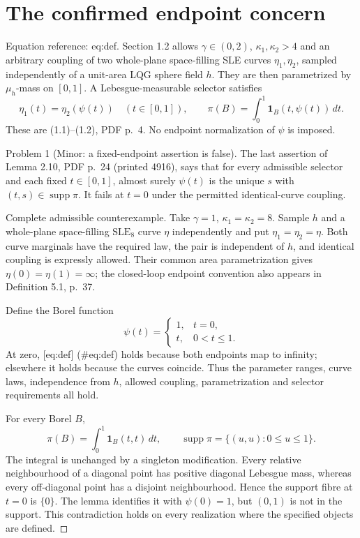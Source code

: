 \documentclass[10pt]{article}
\begin{document}
\section*{The confirmed endpoint concern}
Equation reference: eq:def. Section 1.2 allows \(\gamma\in(0,2)\), \(\kappa_1,\kappa_2>4\) and an arbitrary coupling of two whole-plane space-filling SLE curves \(\eta_1,\eta_2\), sampled independently of a unit-area LQG sphere field \(h\). They are then parametrized by \(\mu_h\)-mass on \([0,1]\). A Lebesgue-measurable selector satisfies \[\eta_1(t)=\eta_2(\psi(t))\quad(t\in[0,1]),\qquad
 \pi(B)=\int_0^1\mathbf 1_B(t,\psi(t))\,dt. \] These are (1.1)–(1.2), PDF p. 4. No endpoint normalization of \(\psi\) is imposed.\par
Problem 1 (Minor: a fixed-endpoint assertion is false).  The last assertion of Lemma 2.10, PDF p. 24 (printed 4916), says that for every admissible selector and each fixed \(t\in[0,1]\), almost surely \(\psi(t)\) is the unique \(s\) with \((t,s)\in\operatorname{supp}\pi\). It fails at \(t=0\) under the permitted identical-curve coupling.\par
Complete admissible counterexample. Take \(\gamma=1\), \(\kappa_1=\kappa_2=8\). Sample \(h\) and a whole-plane space-filling \(\mathrm{SLE}_8\) curve \(\eta\) independently and put \(\eta_1=\eta_2=\eta\). Both curve marginals have the required law, the pair is independent of \(h\), and identical coupling is expressly allowed. Their common area parametrization gives \(\eta(0)=\eta(1)=\infty\); the closed-loop endpoint convention also appears in Definition 5.1, p. 37.\par
Define the Borel function \[\psi(t)=\begin{cases}1,&t=0,\\t,&0<t\leq1.\end{cases}\] At zero, [eq:def] (\#eq:def) holds because both endpoints map to infinity; elsewhere it holds because the curves coincide. Thus the parameter ranges, curve laws, independence from \(h\), allowed coupling, parametrization and selector requirements all hold.\par
For every Borel \(B\), \[\pi(B)=\int_0^1\mathbf 1_B(t,t)\,dt,\qquad
 \operatorname{supp}\pi=\{(u,u):0\leq u\leq1\}.\] The integral is unchanged by a singleton modification. Every relative neighbourhood of a diagonal point has positive diagonal Lebesgue mass, whereas every off-diagonal point has a disjoint neighbourhood. Hence the support fibre at \(t=0\) is \(\{0\}\). The lemma identifies it with \(\psi(0)=1\), but \((0,1)\) is not in the support. This contradiction holds on every realization where the specified objects are defined. ◻\par
\end{document}
